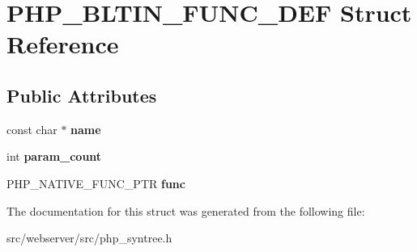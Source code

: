 \section{PHP\_\-BLTIN\_\-FUNC\_\-DEF Struct Reference}
\label{structPHP__BLTIN__FUNC__DEF}
\subsection*{Public Attributes}
\begin{DoxyCompactItemize}
\item 
const char $\ast$ {\bfseries name}\label{structPHP__BLTIN__FUNC__DEF_a100ff8aac0a45080019789a37c99654b}

\item 
int {\bfseries param\_\-count}\label{structPHP__BLTIN__FUNC__DEF_adb6f497b96c7eac0266a2a7c0b96582c}

\item 
PHP\_\-NATIVE\_\-FUNC\_\-PTR {\bfseries func}\label{structPHP__BLTIN__FUNC__DEF_aad02111450b6e143e574f03b6d5bc9a8}

\end{DoxyCompactItemize}


The documentation for this struct was generated from the following file:\begin{DoxyCompactItemize}
\item 
src/webserver/src/php\_\-syntree.h\end{DoxyCompactItemize}
